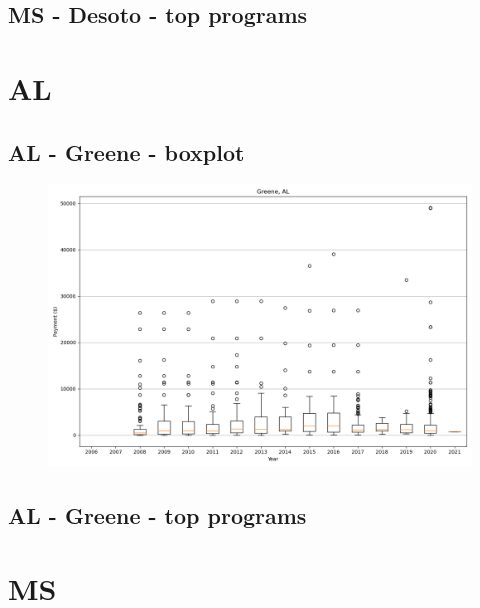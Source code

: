 \subsection*{MS - Desoto - top programs}

\newpage
\section*{AL}
\subsection*{AL - Greene - boxplot}
\begin{figure}[h]
\centering
\includegraphics[width=7in]{../output/boxplots/counties/Greene-AL_boxplot.png}
\end{figure}


\subsection*{AL - Greene - top programs}

\newpage
\section*{MS}
